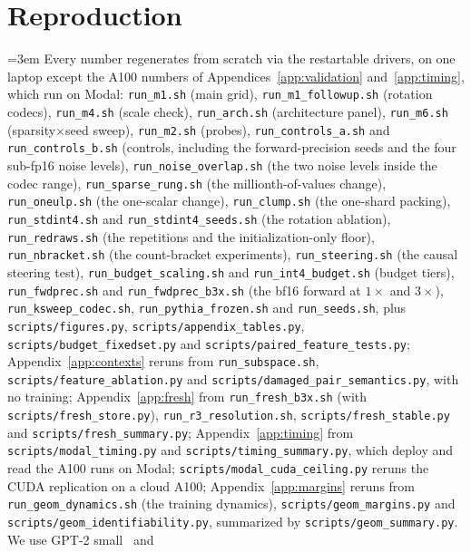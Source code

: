 \documentclass{article}
\begin{document}
\section{Reproduction}
\label{app:repro}
\begingroup\sloppy\emergencystretch=3em
Every number regenerates from scratch via the restartable drivers, on
one laptop except the A100 numbers of Appendices~\ref{app:validation}
and~\ref{app:timing}, which run on Modal:
\texttt{run\_m1.sh} (main grid), \texttt{run\_m1\_followup.sh}
(rotation codecs), \texttt{run\_m4.sh} (scale check),
\texttt{run\_arch.sh} (architecture panel), \texttt{run\_m6.sh}
(sparsity$\times$seed sweep), \texttt{run\_m2.sh} (probes),
\texttt{run\_controls\_a.sh} and \texttt{run\_controls\_b.sh}
(controls, including the forward-precision seeds and the four
sub-fp16 noise levels), \texttt{run\_noise\_overlap.sh} (the two noise
levels inside the codec range), \texttt{run\_sparse\_rung.sh} (the
millionth-of-values change), \texttt{run\_oneulp.sh} (the one-scalar
change), \texttt{run\_clump.sh} (the one-shard packing),
\texttt{run\_stdint4.sh} and \texttt{run\_stdint4\_seeds.sh} (the
rotation ablation), \texttt{run\_redraws.sh} (the repetitions
and the initialization-only floor), \texttt{run\_nbracket.sh} (the
count-bracket experiments),
\texttt{run\_steering.sh} (the causal steering test), \texttt{run\_budget\_scaling.sh} and
\texttt{run\_int4\_budget.sh} (budget tiers), \texttt{run\_fwdprec.sh}
and \texttt{run\_fwdprec\_b3x.sh} (the bf16 forward at $1\times$ and
$3\times$),
\texttt{run\_ksweep\_codec.sh}, \texttt{run\_pythia\_frozen.sh} and
\texttt{run\_seeds.sh}, plus \texttt{scripts/figures.py},
\texttt{scripts/appendix\_tables.py}, \texttt{scripts/budget\_fixedset.py}
and \texttt{scripts/paired\_feature\_tests.py}; Appendix~\ref{app:contexts}
reruns from \texttt{run\_subspace.sh}, \texttt{scripts/feature\_ablation.py}
and \texttt{scripts/damaged\_pair\_semantics.py}, with no training;
Appendix~\ref{app:fresh} from \texttt{run\_fresh\_b3x.sh} (with
\texttt{scripts/fresh\_store.py}), \texttt{run\_r3\_resolution.sh},
\texttt{scripts/fresh\_stable.py} and \texttt{scripts/fresh\_summary.py};
Appendix~\ref{app:timing} from \texttt{scripts/modal\_timing.py} and
\texttt{scripts/timing\_summary.py}, which deploy and read the A100 runs
on Modal;
\texttt{scripts/modal\_cuda\_ceiling.py} reruns the CUDA replication on
a cloud A100; Appendix~\ref{app:margins} reruns from
\texttt{run\_geom\_dynamics.sh} (the training dynamics),
\texttt{scripts/geom\_margins.py} and
\texttt{scripts/geom\_identifiability.py}, summarized by
\texttt{scripts/geom\_summary.py}. We use GPT-2 small~\citep{gpt2} and
\end{document}
